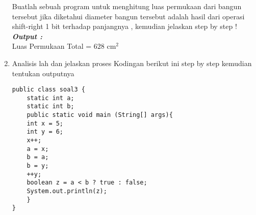 \documentclass[a4paper, 12pt]{article}
\begin{document}
\begin{enumerate}
\begin{center}
    \end{center}
    
        Buatlah sebuah program untuk menghitung luas permukaan dari bangun tersebut jika diketahui diameter bangun tersebut adalah hasil dari operasi shift-right 1 bit terhadap panjangnya , kemudian jelaskan step by step !\\

        \textbf{\textit{Output :}}\\
        Luas Permukaan Total = $628$ cm$^2$    
        

    \newpage
    \item Analisis lah dan jelaskan proses Kodingan berikut ini step by step kemudian tentukan outputnya 
    \begin{lstlisting}[style=standard]
public class soal3 {
    static int a;
    static int b;
    public static void main (String[] args){
    int x = 5;
    int y = 6;
    x++;
    a = x;
    b = a;
    b = y;
    ++y;
    boolean z = a < b ? true : false;
    System.out.println(z);
    }
}
    \end{lstlisting}
\end{enumerate}
\end{document}
